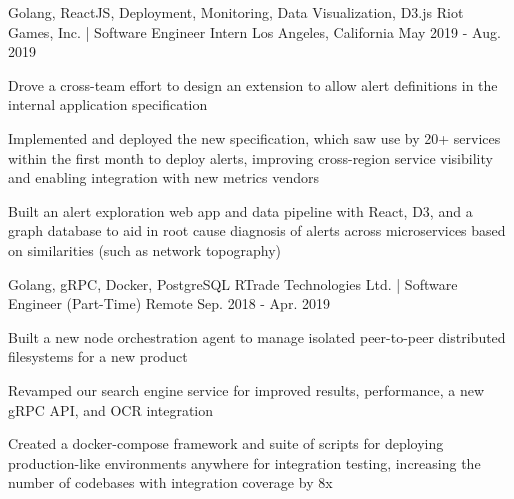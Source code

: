 

\begin{cventries}

\iffalse
  \cventry
    {NodeJS, MongoDB} %
    {Sumus Properties Group Ltd. | Software Developer (Part-Time)} %
    {Remote} %
    {Oct. 2019 - Present} %
    {
      \begin{cvitems} %
        \item {Building data management tooling between databases and API platforms with NodeJS}
      \end{cvitems}
    }
\fi
  \cventry
    {Golang, ReactJS, Deployment, Monitoring, Data Visualization, D3.js} %
    {Riot Games, Inc. | Software Engineer Intern} %
    {Los Angeles, California} %
    {May 2019 - Aug. 2019} %
    {
      \begin{cvitems} %
        \item {Drove a cross-team effort to design an extension to allow alert definitions in the internal application specification}
        \item{Implemented and deployed the new specification, which saw use by 20+ services within the first month to deploy alerts, improving cross-region service visibility and enabling integration with new metrics vendors}
        \item {Built an alert exploration web app and data pipeline with React, D3, and a graph database to aid in root cause diagnosis of alerts across microservices based on similarities (such as network topography)}
      \end{cvitems}
    }

  \cventry
    {Golang, gRPC, Docker, PostgreSQL} %
    {RTrade Technologies Ltd. | Software Engineer (Part-Time)} %
    {Remote} %
    {Sep. 2018 - Apr. 2019} %
    {
      \begin{cvitems} %
        \item {Built a new node orchestration agent to manage isolated peer-to-peer distributed filesystems for a new product}
        \item {Revamped our search engine service for improved results, performance, a new gRPC API, and OCR integration}
        \item {Created a docker-compose framework and suite of scripts for deploying production-like environments anywhere for integration testing, increasing the number of codebases with integration coverage by 8x}
      \end{cvitems}
    }


\end{cventries}
